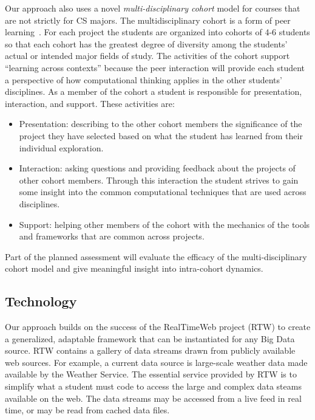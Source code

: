 \documentclass[11pt]{article}
\begin{document}
Our approach also uses a novel \textit{multi-disciplinary cohort}
model for courses that are not strictly for CS majors. The multidisciplinary cohort is a form of peer learning~\cite{herrington-instructional}. For each project the students are organized into cohorts of 4-6 students so that each cohort has the greatest degree of diversity among the students' actual or intended major fields of study.  The activities of the cohort support ``learning across contexts'' because the peer interaction will provide each student a perspective of how computational thinking applies in the other students' disciplines. As a member of the cohort a student is responsible for presentation, interaction, and support. These activities are:

\begin{itemize}
	\item Presentation: describing to the other cohort members the significance of the project they have selected based on what the student has learned from their individual exploration.
	\item Interaction: asking questions and providing feedback about the projects of other cohort members. Through this interaction the student strives to gain some insight into the common computational techniques that are used across disciplines.
	\item Support: helping other members of the cohort with the mechanics of the tools and frameworks that are common across projects.
\end{itemize}

Part of the planned assessment will evaluate the efficacy of the multi-disciplinary cohort model and give meaningful insight into intra-cohort dynamics.

\subsection{Technology}

Our approach builds on the success of the RealTimeWeb project (RTW) to
create a generalized, adaptable framework that can be instantiated for
any Big Data source. RTW contains a gallery of data streams drawn from
publicly available web sources. For example, a current data source is
large-scale weather data made available by the Weather Service. The
essential service provided by RTW is to simplify what a student must
code to access the large and complex data steams available on the
web. The data streams may be accessed from a live feed in real time,
or may be read from cached data files.
\end{document}
